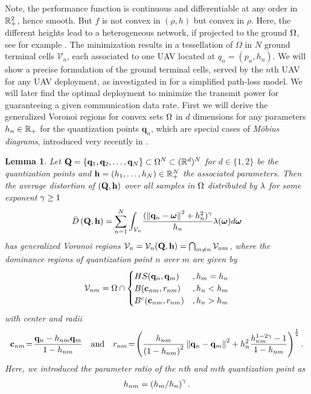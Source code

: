 \documentclass[smallabstract,smallcaptions]{dccpaper}
\newtheorem{lemma}{Lemma}
\newcounter{example}[section]
\renewcommand{\vp}{\mathbf q}
\renewcommand{\vP}{\mathbf Q}
\newcommand{\df}{\ensuremath{\lam}}         %
\newcommand{\gP}{\ensuremath{\vP}}          %
\newcommand{\gp}{\ensuremath{\vp}}          %
\newcommand{\fH}{\ensuremath{\vh}}          %
\newcommand{\fh}{\ensuremath{h}}          %
\newcommand{\Vor}{\ensuremath{\mathcal{V}}}         %
\newcommand{\Dis}{\ensuremath{D}}                    %
\newcommand{\AvDis}{\ensuremath{\bar{\Dis}}}         %
\begin{document}
  Note, the performance function is continuous and differentiable at any order in ${\mathbb R}^2_+$, hence smooth. But $f$ is not
  convex in $(\rho,h)$ but convex in $\rho$. 
  Here, the different heights lead to a heterogeneous network, if projected to the ground $\Omega$, see for example
  \cite{GJ16a}.  The minimization results in a tessellation of $\Omega$ in $N$ ground terminal cells $\Vor_n$, each
  associated to one UAV located at $q_n=(p_n,h_n)$.  We will show a precise formulation of the ground terminal cells,
  served by the $n$th UAV for any UAV deployment, as investigated in \cite{MSBD16b} for a simplified path-loss model. We
  will later find the optimal deployment to minimize the transmit power for guaranteeing a given communication data rate.
  \fi
%
First we will derive the generalized Voronoi regions for convex sets $\Omega$ in $d$ dimensions for any parameters
$h_n\in{\ensuremath{\mathbb R}}_+$  for the quantization points $\vp_n$, which are special cases of \emph{M{\"o}bius diagrams},
introduced very recently in \cite{BWY07}. 
%
\begin{lemma}\label{lem:moebiusdia}
  Let $\vP=\{\gp_1,\gp_2,\dots, \gp_N\}\subset \Omega^N\subset (\R^d)^N$ for $d\in\{1,2\}$ be the quantization points 
  and $\fH=(\fh_1,\dots,\fh_N)\in\R_+^N$  the associated parameters. Then the average distortion of $(\vP,\vh)$ 
  over all samples in $\Omega$ distributed by $\df$ for  some exponent $\gamma\geq1$ 
  \begin{align}
    \AvDis\left(\vP,\fH\right) 
    = \sum_{n=1}^{N} \int_{\Vor_n} \! \frac{ (\Norm{\gp_n- \vome}^2 +h_n^2)^{\gam}}{h_n} \df(\vome)d\vome
       \label{eq:minimizationmoebius}
  \end{align}
  has generalized Voronoi regions $\Vor_n= \Vor_{n}(\gP,\fH)= \bigcap_{m\not=n} \Vor_{nm}$, 
  where the dominance regions of quantization point $n$ over $m$ are given by
  \begin{align}
    \Vor_{nm}=\Omega\cap\begin{cases}
         HS(\gp_n,\gp_m)&, h_m=h_n \\
         B(\vc_{nm},r_{nm}) &, h_n<h_m\\
         B^c(\vc_{nm},r_{nm}) &, h_n>h_m 
        \end{cases}\label{eq:moebius}
  \end{align}
  with center and radii
  \begin{align}
    \vc_{nm}\!=\!\frac{\gp_n - h_{nm}\gp_m}{1-h_{nm}}
    \quad\text{and}\quad 
    r_{nm}\!=\!\left(\frac{h_{nm}}{\left(1-h_{nm}\right)^2}\Norm{\gp_n-\gp_m}^2  + h_n^2 \frac{h_{nm}^{1-2\gam}
  -1}{1-h_{nm}}\right)^{\frac{1}{2}}.
  \label{eq:rnmcnm}
  \end{align}
  Here, we introduced the parameter ratio of the $n$th and $m$th quantization point as
  \begin{align}
    h_{nm}= \left(h_m/h_n\right)^{\gamma}.
  \end{align}
\end{lemma}
\end{document}
